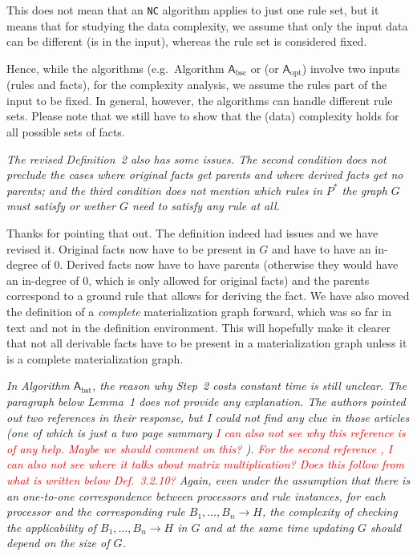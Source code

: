 \documentclass{article}
\let\quoteOld\quote
\let\endquoteOld\endquote
\renewenvironment{quote}{\quoteOld\itshape}{\endquoteOld}
\begin{document}
This does not mean that an \texttt{NC} algorithm applies to just one
rule set, but it means that for studying the data complexity, we
assume that only the input data can be different (is in the input),
whereas the rule set is considered fixed.

Hence, while the algorithms (e.g.\ Algorithm $\mathsf{A}_\text{bsc}$
or (or $\mathsf{A}_\text{opt}$) involve two inputs (rules and facts),
for the complexity analysis, we assume the rules part of the input to
be fixed. In general, however, the algorithms can handle different
rule sets. Please note that we still have to show that the (data)
complexity holds for all possible sets of facts.

\begin{quote}
  The revised Definition~2 also has some issues. The second condition
  does not preclude the cases where original facts get parents and
  where derived facts get no parents; and the third condition does not
  mention which rules in $P^*$ the graph $G$ must satisfy or wether
  $G$ need to satisfy any rule at all.
\end{quote}

Thanks for pointing that out. The definition indeed had issues and we
have revised it. Original facts now have to be present in $G$ and have
to have an in-degree of $0$. Derived facts now have to have parents
(otherwise they would have an in-degree of $0$, which is only allowed
for original facts) and the parents correspond to a ground rule that
allows for deriving the fact. We have also moved the definition of a
\emph{complete} materialization graph forward, which was so far in
text and not in the definition environment. This will hopefully make
it clearer that not all derivable facts have to be present in a
materialization graph unless it is a complete materialization graph.

\begin{quote}
  In Algorithm $\mathsf{A}_\text{bst}$, the reason why Step~2 costs
  constant time is still unclear. The paragraph below Lemma~1 does not
  provide any explanation. The authors pointed out two references in
  their response, but I could not find any clue in those articles (one
  of which is just a two page summary \textcolor{red}{I can also not
    see why this reference is of any help. Maybe we should comment on
    this? }). \textcolor{red}{For the second reference
    \cite{Raymond95}, I can also not see where it talks about matrix
    multiplication? Does this follow from what is written below
    Def.~3.2.10?} Again, even under the assumption that there is an
  one-to-one correspondence between processors and rule instances, for
  each processor and the corresponding rule $B_1, \ldots, B_n \to H$,
  the complexity of checking the applicability of
  $B_1, \ldots, B_n \to H$ in $G$ and at the same time updating $G$
  should depend on the size of $G$.
\end{quote}
\end{document}
